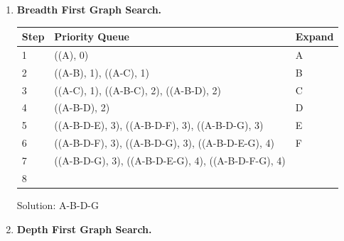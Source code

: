 \documentclass[11pt]{article}
\begin{document}
  \begin{enumerate}

  \item {\bf Breadth First Graph Search.} \\    

    \begin{center}
    \begin{tabular}{|l|l@{\hspace*{1in}}|l|} \hline
    \bf Step & \bf Priority Queue                                   & \bf Expand \\ \hline
    1 & ((A), 0)                                                    &  A\\ \hline
    2 & ((A-B), 1), ((A-C), 1)                                      &  B\\ \hline
    3 & ((A-C), 1), ((A-B-C), 2), ((A-B-D), 2)                      &  C\\ \hline
    4 & ((A-B-D), 2)                                                &  D\\ \hline
    5 & ((A-B-D-E), 3), ((A-B-D-F), 3), ((A-B-D-G), 3)              &  E\\ \hline
    6 & ((A-B-D-F), 3), ((A-B-D-G), 3), ((A-B-D-E-G), 4)            &  F\\ \hline
    7 & ((A-B-D-G), 3), ((A-B-D-E-G), 4), ((A-B-D-F-G), 4)          &  \\ \hline
    8 &                                                             &  \\ \hline
    \end{tabular}
    \end{center}

    Solution: A-B-D-G

\clearpage

  \item {\bf Depth First Graph Search.} \\


\end{enumerate}
\end{document}
